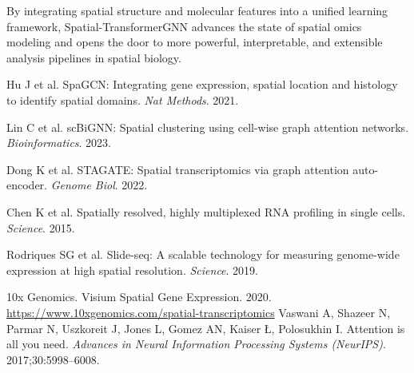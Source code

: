 \documentclass[unnumsec,webpdf,contemporary,medium]{oup-authoring-template}
\begin{document}
By integrating spatial structure and molecular features into a unified learning framework, Spatial-TransformerGNN advances the state of spatial omics modeling and opens the door to more powerful, interpretable, and extensible analysis pipelines in spatial biology.


\begin{thebibliography}{9}

Hu J et al. SpaGCN: Integrating gene expression, spatial location and histology to identify spatial domains. \textit{Nat Methods}. 2021.

Lin C et al. scBiGNN: Spatial clustering using cell-wise graph attention networks. \textit{Bioinformatics}. 2023.

Dong K et al. STAGATE: Spatial transcriptomics via graph attention auto-encoder. \textit{Genome Biol}. 2022.

Chen K et al. Spatially resolved, highly multiplexed RNA profiling in single cells. \textit{Science}. 2015.

Rodriques SG et al. Slide-seq: A scalable technology for measuring genome-wide expression at high spatial resolution. \textit{Science}. 2019.

10x Genomics. Visium Spatial Gene Expression. 2020. \url{https://www.10xgenomics.com/spatial-transcriptomics}
Vaswani A, Shazeer N, Parmar N, Uszkoreit J, Jones L, Gomez AN, Kaiser Ł, Polosukhin I. Attention is all you need. \textit{Advances in Neural Information Processing Systems (NeurIPS)}. 2017;30:5998–6008.
\end{thebibliography}
\end{document}

